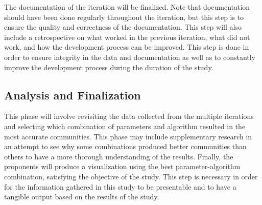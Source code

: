 The documentation of the iteration will be finalized. Note that documentation should have been done regularly throughout the iteration, but this step is to ensure the quality and correctness of the documentation. This step will also include a retrospective on what worked in the previous iteration, what did not work, and how the development process can be improved. This step is done in order to ensure integrity in the data and documentation as well as to constantly improve the development process during the duration of the study.




\subsection{Analysis and Finalization}




This phase will involve revisiting the data collected from the multiple iterations and selecting which combination of parameters and algorithm resulted in the most accurate communities. This phase may include supplementary research in an attempt to see why some combinations produced better communities than others to have a more thorough understanding of the results. Finally, the proponents will produce a visualization using the best parameter-algorithm combination, satisfying the objective of the study. This step is necessary in order for the information gathered in this study to be presentable and to have a tangible output based on the results of the study.




